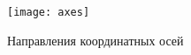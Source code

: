 \begin{figure}[!htbp]
	\captionsetup{skip=5mm} %
	\centering
	\texttt{[image: axes]}
	\caption{Направления координатных осей}
	\label{fig:axes}
\end{figure}